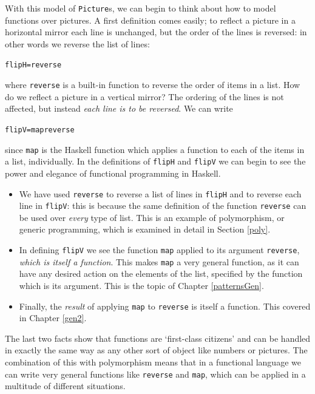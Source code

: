 With this model of \texttt{Picture}s, we can begin to think about how to
model functions over pictures. A first definition comes easily; to
reflect a picture in a horizontal mirror each line is unchanged, but
the order of the lines is reversed: in other words we reverse the list
of lines:
\begin{alltt}
flipH = reverse
\end{alltt}
where \texttt{reverse} is a built-in function to reverse the order of items
in a list.
How do we reflect a picture in a vertical mirror? The ordering of the
lines is not affected, but instead {\em each line is to be reversed}. We can write
\begin{alltt}
flipV = map reverse
\end{alltt}
since \texttt{map} is the Haskell function which applies a function
to each of the items in a list, individually.
In the definitions of \texttt{flipH} and \texttt{flipV} we can begin to see the power 
and elegance of
functional programming in Haskell.
\begin{itemize}
\item 
We have used \texttt{reverse} to reverse a list of lines in
\texttt{flipH} and to reverse each line in \texttt{flipV}: this is
because the same
definition of the function \texttt{reverse} can be used over {\em every\/}
type of list. This is an example of polymorphism, or generic
programming, which is examined in detail in Section \ref{poly}.
\item 
In defining \texttt{flipV} we see the function \texttt{map}
applied to its argument \texttt{reverse}, {\em which is itself a
function}. This makes \texttt{map} a very general function, as it can have
any desired action on the elements of the list, specified by the function
which is its argument. This is the topic of Chapter \ref{patternsGen}.
\item 
Finally, the {\em result\/} of applying \texttt{map} to
\texttt{reverse} is itself a function. This covered in Chapter \ref{gen2}.
\end{itemize}
The last two facts show that functions are `first-class citizens'
and
can be handled in exactly the same way as any other sort of object like
numbers or pictures. The combination of this with polymorphism means
that in a functional language we can write very general functions like
\texttt{reverse} and \texttt{map}, which can be applied in a multitude of
different situations.

